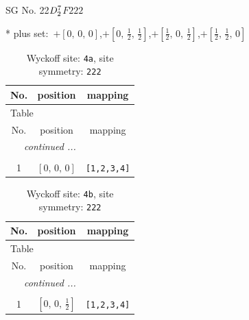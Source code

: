 \documentclass[fleqn,8pt]{jsarticle}
\begin{document}
\setcounter{MaxMatrixCols}{32}

\renewcommand{\tablename}{Table~}
\renewcommand{\figurename}{Figure~}
\begin{center}
\LARGE
SG No. 22\quad$D_{\rm 2}^{7}$\quad$F222$\quad[ orthorhombic ]
\end{center}
* plus set:\,\,\,$+\left[ 0,\, 0,\, 0 \right]$,\quad $+\left[ 0,\, \frac{1}{2},\, \frac{1}{2} \right]$,\quad $+\left[ \frac{1}{2},\, 0,\, \frac{1}{2} \right]$,\quad $+\left[ \frac{1}{2},\, \frac{1}{2},\, 0 \right]$
\renewcommand{\arraystretch}{1.2}
\begin{longtable}{ccc}
\caption{Wyckoff site: {\tt 4a}, site symmetry: {\tt 222}}
 \\
 \hline \hline
No. & position & mapping \\ \hline \endfirsthead

\multicolumn{2}{l}{\tablename\ \thetable{}} \\
 \hline \hline
No. & position & mapping \\ \hline \endhead

 \hline \hline
\multicolumn{2}{r}{\footnotesize\it continued ...} \\ \endfoot

 \hline \hline
\multicolumn{2}{r}{} \\ \endlastfoot

1 & $\left[ 0,\, 0,\, 0 \right]$ & {\tt [1,2,3,4]} \\
\end{longtable}
\renewcommand{\arraystretch}{1.2}
\begin{longtable}{ccc}
\caption{Wyckoff site: {\tt 4b}, site symmetry: {\tt 222}}
 \\
 \hline \hline
No. & position & mapping \\ \hline \endfirsthead

\multicolumn{2}{l}{\tablename\ \thetable{}} \\
 \hline \hline
No. & position & mapping \\ \hline \endhead

 \hline \hline
\multicolumn{2}{r}{\footnotesize\it continued ...} \\ \endfoot

 \hline \hline
\multicolumn{2}{r}{} \\ \endlastfoot

1 & $\left[ 0,\, 0,\, \frac{1}{2} \right]$ & {\tt [1,2,3,4]} \\
\end{longtable}
\renewcommand{\arraystretch}{1.2}
\end{document}

